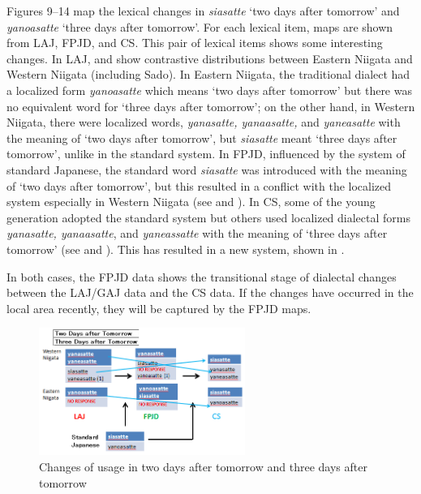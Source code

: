 \documentclass[output=paper]{LSP/langsci}
\begin{document}
Figures 9--14 map the lexical changes in \textit{siasatte} `two days after tomorrow' and \textit{yanoasatte} `three days after tomorrow'.  For each lexical item, maps are shown from \textsc{LAJ}, \textsc{FPJD}, and \textsc{CS}. This pair of lexical items shows some interesting changes.  In \textsc{LAJ},  and  show contrastive distributions between Eastern Niigata and Western Niigata (including Sado).  In Eastern Niigata, the traditional dialect had a localized form \textit{yanoasatte} which means `two days after tomorrow' but there was no equivalent word for `three days after tomorrow'; on the other hand, in Western Niigata, there were localized words, \textit{yanasatte, yanaasatte,} and \textit{yaneasatte} with the meaning of `two days after tomorrow', but \textit{siasatte} meant `three days after tomorrow', unlike in the standard system. In \textsc{FPJD}, influenced by the system of standard Japanese, the standard word \textit{siasatte} was introduced with the meaning of `two days after tomorrow', but this resulted in a conflict with the localized system especially in Western Niigata (see  and ).  In \textsc{CS}, some of the young generation adopted the standard system but others used localized dialectal forms \textit{yanasatte, yanaasatte}, and \textit{yaneassatte} with the meaning of `three days after tomorrow' (see  and ). This has resulted in a new system, shown in .

In both cases, the \textsc{FPJD} data shows the transitional stage of dialectal changes between the \textsc{LAJ}/\textsc{GAJ} data and the \textsc{CS} data. If the changes have occurred in the local area recently, they will be captured by the \textsc{FPJD} maps.

\begin{figure}
\includegraphics[width=0.6\textwidth]{illustrations/fuku2_fig7}
\caption{Changes of usage in {\textquotedbl}two days after tomorrow{\textquotedbl} and {\textquotedbl}three days after tomorrow{\textquotedbl}}
\label{fig:7}
\end{figure}
\end{document}
